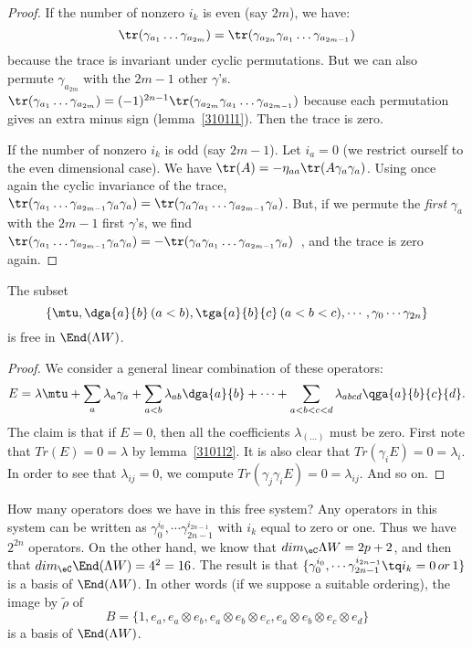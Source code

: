 \begin{proof}
	If the number of nonzero $i_k$ is even (say $2m$), we have:
	\[
		\tr(\gamma_{a_1}\ldots\gamma_{a_{2m}})=\tr(\gamma_{a_{2n}}\gamma_{a_1}\ldots\gamma_{a_{2m-1}})
	\]
	because the trace is invariant under cyclic permutations. But we can also permute $\gamma_{a_{2m}}$ with the $2m-1$ other $\gamma$'s.  $\tr(\gamma_{a_1}\ldots\gamma_{a_{2m}})=(-1)^{2n-1}\tr(\gamma_{a_{2m}}\gamma_{a_1}\ldots\gamma_{a_{2m-1}})$ because each permutation gives an extra minus sign (\hbox{lemma~\ref{3101l1}}). Then the trace is zero.

	If the number of nonzero $i_k$ is odd (say $2m-1$). Let $i_a=0$ (we restrict ourself to the even dimensional case). We have $\tr(A)=-\eta_{aa}\tr(A\gamma_a\gamma_a)$. Using once again the cyclic invariance of the trace, $\tr(\gamma_{a_1}\ldots\gamma_{a_{2m-1}}\gamma_a\gamma_a)=\tr(\gamma_a\gamma_{a_1}\ldots\gamma_{a_{2m-1}}\gamma_a)$. But, if we permute the \emph{first} $\gamma_a$ with the $2m-1$ first $\gamma$'s, we find \hbox{$\tr(\gamma_{a_1}\ldots\gamma_{a_{2m-1}}\gamma_a\gamma_a)=-\tr(\gamma_a\gamma_{a_1}\ldots\gamma_{a_{2m-1}}\gamma_a)$ }, and the trace is zero again.
\end{proof}

\begin{proposition}
	The subset
	\[
		\left\{\mtu,\dga{a}{b}\,(a<b),\tga{a}{b}{c}\,(a<b<c), \cdots, \gamma_{0}\cdots\gamma_{2n} \right\}
	\]
	is free in $\End(\Lambda W)$.
\end{proposition}

\begin{proof}
	We consider a general linear combination of these operators:
	\[
		E=\lambda\mtu+\sum_a\lambda_a\gamma_a+\sum_{a<b}\lambda_{ab}\dga{a}{b}+\cdots+
		\sum_{a<b<c<d}\lambda_{abcd}\qga{a}{b}{c}{d}.
	\]
	The claim is that if $E=0$, then all the coefficients $\lambda_{(\ldots)}$ must be zero. First note that $Tr(E)=0=\lambda$ by lemma~\ref{3101l2}. It is also clear that $Tr(\gamma_iE)=0=\lambda_i$. In order to see that $\lambda_{ij}=0$, we compute $Tr(\gamma_j\gamma_iE)=0=\lambda_{ij}$. And so on.
\end{proof}

How many operators does we have in this free system? Any operators in this system can be written as $\gamma_{0}^{i_{0}},\cdots\gamma^{i_{2n-1}}_{2n-1}$ with $i_k$ equal to zero or one. Thus we have $2^{2n}$ operators. On the other hand, we know that $dim_{\eC}\Lambda W=2p+2$, and then that $dim_{\eC}\End(\Lambda W)=4^2=16$. The result is that $\{ \gamma_{0}^{i_{0}},\cdots\gamma^{i_{2n-1}}_{2n-1}  \tq i_k=0\,or\,1\}$ is a basis of $\End(\Lambda W)$. In other words (if we suppose a suitable ordering), the image by $\tilde\rho$ of
\[
	B=\{1,e_a,e_a\otimes e_b,e_a\otimes e_b\otimes e_c,e_a\otimes e_b\otimes e_c\otimes e_d\}
\]
is a basis of $\End(\Lambda W)$.

